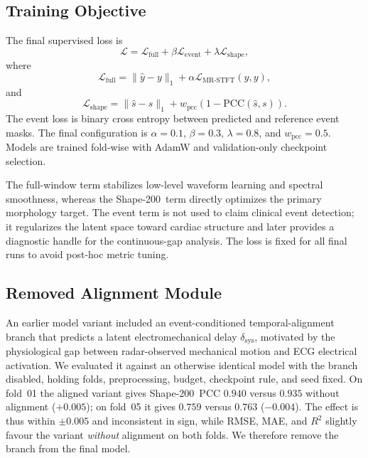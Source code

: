 \documentclass[lettersize,journal]{IEEEtran}
\newcommand{\shape}{Shape-200\xspace}
\begin{document}
\subsection{Training Objective}
The final supervised loss is
\begin{equation}
    \mathcal{L}
    = \mathcal{L}_{\mathrm{full}}
    + \beta \mathcal{L}_{\mathrm{event}}
    + \lambda \mathcal{L}_{\mathrm{shape}},
\end{equation}
where
\begin{equation}
    \mathcal{L}_{\mathrm{full}}
    = \| \hat{y} - y \|_1
    + \alpha \mathcal{L}_{\mathrm{MR\text{-}STFT}}(\hat{y}, y),
\end{equation}
and
\begin{equation}
    \mathcal{L}_{\mathrm{shape}}
    = \| \hat{s} - s \|_1
    + w_{\mathrm{pcc}}\left(1-\mathrm{PCC}(\hat{s},s)\right).
\end{equation}
The event loss is binary cross entropy between predicted and reference event masks. The final configuration is $\alpha=0.1$, $\beta=0.3$, $\lambda=0.8$, and $w_{\mathrm{pcc}}=0.5$. Models are trained fold-wise with AdamW and validation-only checkpoint selection.

The full-window term stabilizes low-level waveform learning and spectral smoothness, whereas the \shape\ term directly optimizes the primary morphology target. The event term is not used to claim clinical event detection; it regularizes the latent space toward cardiac structure and later provides a diagnostic handle for the continuous-gap analysis. The loss is fixed for all final runs to avoid post-hoc metric tuning.

\subsection{Removed Alignment Module}
\label{sec:alignment}
An earlier model variant included an event-conditioned temporal-alignment branch that predicts a latent electromechanical delay $\delta_{\mathrm{sys}}$, motivated by the physiological gap between radar-observed mechanical motion and ECG electrical activation. We evaluated it against an otherwise identical model with the branch disabled, holding folds, preprocessing, budget, checkpoint rule, and seed fixed. On fold~01 the aligned variant gives \shape\ PCC $0.940$ versus $0.935$ without alignment ($+0.005$); on fold~05 it gives $0.759$ versus $0.763$ ($-0.004$). The effect is thus within $\pm0.005$ and inconsistent in sign, while RMSE, MAE, and $R^2$ slightly favour the variant \emph{without} alignment on both folds. We therefore remove the branch from the final model.
\end{document}
